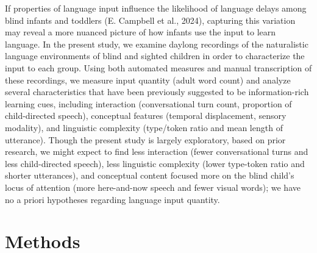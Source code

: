 \documentclass[
  man]{apa6}
\begin{document}
If properties of language input influence the likelihood of language delays among blind infants and toddlers (E. Campbell et al., 2024), capturing this variation may reveal a more nuanced picture of how infants use the input to learn language. In the present study, we examine daylong recordings of the naturalistic language environments of blind and sighted children in order to characterize the input to each group. Using both automated measures and manual transcription of these recordings, we measure input quantity (adult word count) and analyze several characteristics that have been previously suggested to be information-rich learning cues, including interaction (conversational turn count, proportion of child-directed speech), conceptual features (temporal displacement, sensory modality), and linguistic complexity (type/token ratio and mean length of utterance). Though the present study is largely exploratory, based on prior research, we might expect to find less interaction (fewer conversational turns and less child-directed speech), less linguistic complexity (lower type-token ratio and shorter utterances), and conceptual content focused more on the blind child's locus of attention (more here-and-now speech and fewer visual words); we have no a priori hypotheses regarding language input quantity.

\hypertarget{methods}{%
\section{Methods}\label{methods}}
\end{document}
